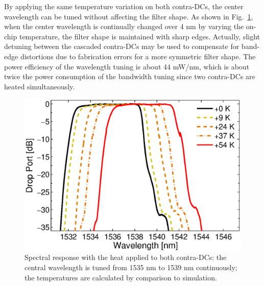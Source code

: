 \documentclass[osajnl,twocolumn,showpacs,superscriptaddress,10pt]{revtex4-1}
\begin{document}
By applying the same temperature variation on both contra-DCs, the center wavelength can be tuned without affecting the filter shape.
As shown in Fig.~\ref{fig:wavTune}, when the center wavelength is continually changed over 4 nm by varying the on-chip temperature, the filter shape is maintained with sharp edges. Actually, slight detuning between the cascaded contra-DCs may be used to compensate for band-edge distortions due to fabrication errors for a more symmetric filter shape. 
The power efficiency of the wavelength tuning is about 44 mW/nm, which is about twice the power consumption of the bandwidth tuning since two contra-DCs are heated simultaneously.
\begin{figure}[htbp]
\centering
\includegraphics[width=.99\columnwidth]{data/Central}
\caption{Spectral response with the heat applied to both contra-DCs: the central wavelength is tuned from 1535 nm to 1539 nm continuously; the temperatures are calculated by comparison to simulation.}
\label{fig:wavTune}
\end{figure} 



\end{document}
